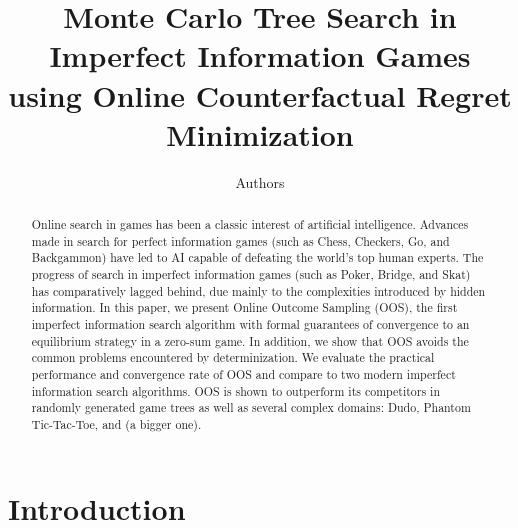 \documentclass[letterpaper]{article}
\begin{document}
%
\title{Monte Carlo Tree Search in Imperfect Information Games\\using Online Counterfactual Regret Minimization}
\author{Authors}


\maketitle

\begin{abstract}
Online search in games has been a classic interest of artificial intelligence.
Advances made in search for perfect information games (such as Chess, Checkers, Go, and Backgammon) have led to AI capable of defeating the world's top human experts. 
The progress of search in imperfect information games (such as Poker, Bridge, and Skat) has comparatively lagged behind, due mainly to the complexities introduced by hidden information. 
In this paper, we present Online Outcome Sampling (OOS), the first imperfect information search algorithm with formal guarantees of convergence to an equilibrium strategy in a zero-sum game.   
In addition, we show that OOS avoids the common problems encountered by determinization.
We evaluate the practical performance and convergence rate of OOS and compare to two modern imperfect information search algorithms.
OOS is shown to outperform its competitors in randomly generated game trees as well as several complex domains: 
Dudo, Phantom Tic-Tac-Toe, and (a bigger one). 
\end{abstract}

\section{Introduction}

\end{document}

